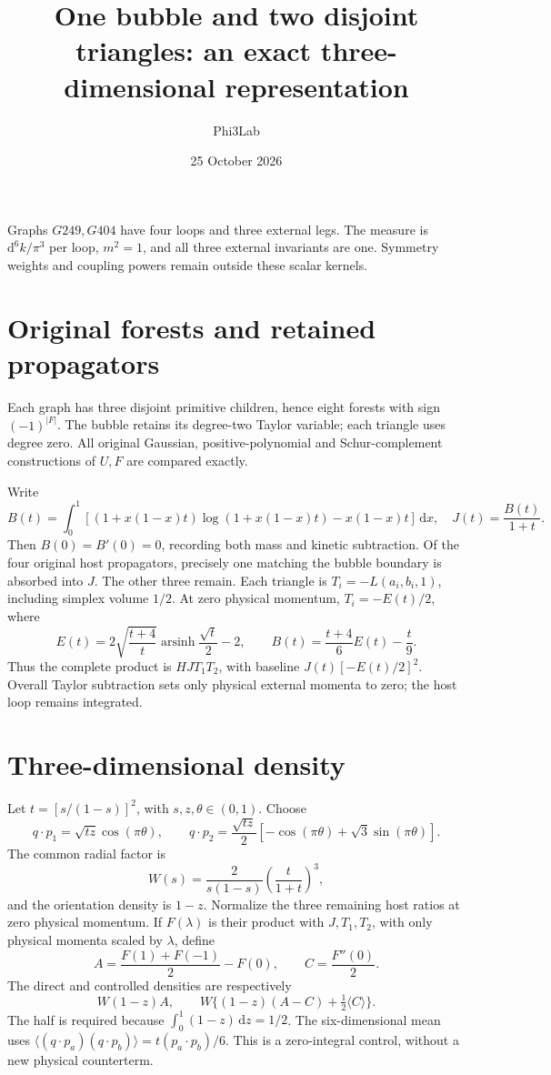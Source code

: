 \documentclass[11pt]{article}
\title{One bubble and two disjoint triangles: an exact three-dimensional representation}
\author{Phi3Lab}
\date{25 October 2026}
\begin{document}
\maketitle
\noindent Graphs \(G249,G404\) have four loops and three external legs.
The measure is \(\mathrm d^6k/\pi^3\) per loop, \(m^2=1\), and all
three external invariants are one. Symmetry weights and coupling
powers remain outside these scalar kernels.

\section*{Original forests and retained propagators}
Each graph has three disjoint primitive children, hence eight
forests with sign \((-1)^{|F|}\). The bubble retains its degree-two
Taylor variable; each triangle uses degree zero. All original
Gaussian, positive-polynomial and Schur-complement constructions
of \(U,F\) are compared exactly.

Write
\[
 B(t)=\int_0^1[(1+x(1-x)t)\log(1+x(1-x)t)-x(1-x)t]\,\mathrm dx,
 \quad J(t)=\frac{B(t)}{1+t}.
\]
Then \(B(0)=B'(0)=0\), recording both mass and kinetic subtraction.
Of the four original host propagators, precisely one matching
the bubble boundary is absorbed into \(J\). The other three remain.
Each triangle is \(T_i=-L(a_i,b_i,1)\), including simplex volume
\(1/2\). At zero physical momentum, \(T_i=-E(t)/2\), where
\[
 E(t)=2\sqrt{\frac{t+4}{t}}\operatorname{arsinh}\frac{\sqrt t}{2}-2,
 \qquad B(t)=\frac{t+4}{6}E(t)-\frac t9.
\]
Thus the complete product is \(HJT_1T_2\), with baseline
\(J(t)[-E(t)/2]^2\). Overall Taylor subtraction sets only physical
external momenta to zero; the host loop remains integrated.

\section*{Three-dimensional density}
Let \(t=[s/(1-s)]^2\), with \(s,z,\theta\in(0,1)\). Choose
\[
 q\cdot p_1=\sqrt{tz}\cos(\pi\theta),\qquad
 q\cdot p_2=\frac{\sqrt{tz}}2[-\cos(\pi\theta)+\sqrt3\sin(\pi\theta)].
\]
The common radial factor is
\[
 W(s)=\frac{2}{s(1-s)}\left(\frac{t}{1+t}\right)^3,
\]
and the orientation density is \(1-z\). Normalize the three
remaining host ratios at zero physical momentum. If \(F(\lambda)\)
is their product with \(J,T_1,T_2\), with only physical momenta
scaled by \(\lambda\), define
\[
 A=\frac{F(1)+F(-1)}2-F(0),\qquad C=\frac{F''(0)}2.
\]
The direct and controlled densities are respectively
\[
 W(1-z)A,\qquad W\{(1-z)(A-C)+\tfrac12\langle C\rangle\}.
\]
The half is required because \(\int_0^1(1-z)\,\mathrm dz=1/2\).
The six-dimensional mean uses
\(\langle(q\cdot p_a)(q\cdot p_b)\rangle=t(p_a\cdot p_b)/6\).
This is a zero-integral control, without a new physical counterterm.
\end{document}

